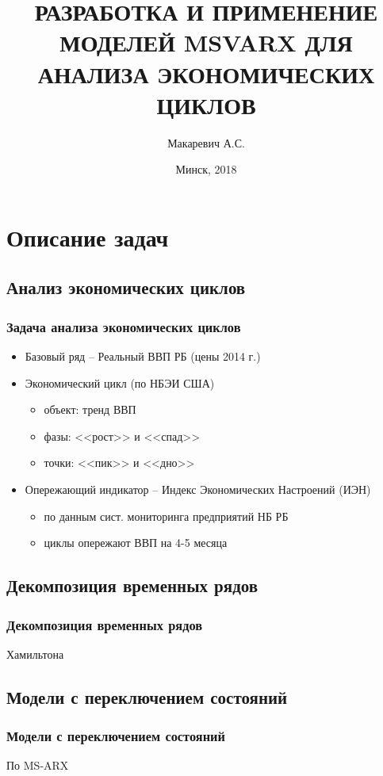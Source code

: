 \documentclass{beamer}
\title{РАЗРАБОТКА И ПРИМЕНЕНИЕ МОДЕЛЕЙ MSVARX ДЛЯ АНАЛИЗА ЭКОНОМИЧЕСКИХ ЦИКЛОВ}
\author{Макаревич А.С.}
\institute[БГУ]{Белорусский Государственный Университет}
\date[Минск, 2018]{Минск, 2018}
\begin{document}
	\begin{frame}
		\titlepage
	\end{frame}

	\section{Описание задач}
		\subsection{Анализ экономических циклов}
		\begin{frame}
			\frametitle{Задача анализа экономических циклов}
			
			\begin{itemize}
				\item Базовый ряд -- Реальный ВВП РБ (цены 2014 г.)
				\item Экономический цикл (по НБЭИ США)
					\begin{itemize}
						\item объект: тренд ВВП
						\item фазы: <<рост>> и <<спад>>
						\item точки: <<пик>> и <<дно>>
						\end{itemize}
				\pause
				\item Опережающий индикатор -- Индекс Экономических Настроений (ИЭН)
					\begin{itemize}
						\item по данным сист. мониторинга предприятий НБ РБ
						\item циклы опережают ВВП на 4-5 месяца
					\end{itemize}
			\end{itemize}
			
		\end{frame}

		\subsection{Декомпозиция временных рядов}
		\begin{frame}
			\frametitle{Декомпозиция временных рядов}
			
			Хамильтона
			
		\end{frame}
	
		\subsection{Модели с переключением состояний}
		\begin{frame}
			\frametitle{Модели с переключением состояний}
			
			По MS-ARX
			
		\end{frame}
	
\end{document}
